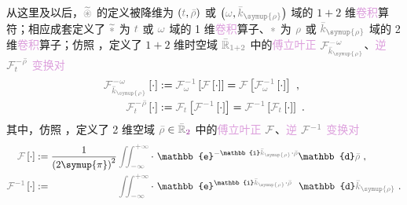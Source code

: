 从这里及以后，$\mathcolor{gray}{\widetilde \circledast}$ 的定义被降维为 $\left( \mathcolor{gray}{t}, \mathcolor{gray}{\bar{\rho}} \right)$ 或 $\left( \mathcolor{gray}{\omega}, \mathcolor{gray}{\bar{k}_{\symup{\rho}}} \right)$ 域的 $1+2$ 维\textcolor{Plum}{卷积}算符；相应成套定义了 $\mathcolor{gray}{\widetilde *}$ 为 $\mathcolor{gray}{t}$ 或 $\mathcolor{gray}{\omega}$ 域的 1 维\textcolor{Plum}{卷积}算子、$\mathcolor{gray}{*}$ 为 $\mathcolor{gray}{\rho}$ 或 $\mathcolor{gray}{\bar{k}_{\symup{\rho}}}$ 域的 2 维\textcolor{Plum}{卷积}算子；仿照 ，定义了 $1+2$ 维时空域 $\mathcolor{gray}{\bar{\mathbb{R}}_{1+2}}$ 中的\textcolor{Plum}{傅立叶正} $\mathcolor{gray}{\mathcal F_{\bar{k}_{\symup{\rho}}}^{-\omega}}$、\textcolor{Plum}{逆} $\mathcolor{gray}{\mathcal F^{-\bar{\rho}}_{t}}$ \textcolor{Plum}{变换对}
\begin{subequations} \label{eq:FT-trho_wkrho}
	\abovedisplayskip=4pt
	\belowdisplayskip=6pt
\begin{align}
	\mathcolor{gray}{\mathcal F_{\bar{k}_{\symup{\rho}}}^{-\omega}} \left[ \cdot \right] &:= \mathcolor{gray}{\mathcal F_{\omega}^{-1}} \left[ \mathcolor{gray}{\mathcal F} \left[ \cdot \right] \right] = \mathcolor{gray}{\mathcal F} \left[ \mathcolor{gray}{\mathcal F_{\omega}^{-1}} \left[ \cdot \right] \right] ~, \label{eq:FT-wkrho} \\
	\mathcolor{gray}{\mathcal F^{-\bar{\rho}}_{t}} \left[ \cdot \right] &:= \mathcolor{gray}{\mathcal F_{t}} \left[ \mathcolor{gray}{\mathcal F^{-1}} \left[ \cdot \right] \right] = \mathcolor{gray}{\mathcal F^{-1}} \left[ \mathcolor{gray}{\mathcal F_{t}} \left[ \cdot \right] \right] ~. \label{eq:IFT-trho}
\end{align}
\end{subequations}
其中，仿照 ，定义了 2 维空域 $\mathcolor{gray}{\bar{\rho}} \in \mathcolor{gray}{\bar{\mathbb{R}}_{\textcolor{Plum}{2}}}$ 中的\textcolor{Plum}{傅立叶正} $\mathcolor{gray}{\mathcal F}$、\textcolor{Plum}{逆} $\mathcolor{gray}{\mathcal F^{-1}}$ \textcolor{Plum}{变换对}
\begin{subequations} \label{eq:FT-rho_krho}
	\belowdisplayskip=8pt
\begin{align}
	\mathcolor{gray}{\mathcal F} \left[ \cdot \right] &:= \frac{ 1 }{ \left( 2\symup{\pi} \right)^2 } \mathcolor{gray}{\iint_{-\infty}^{+\infty}} \cdot~ \mathbb{e}^{-\mathbb{i}\mathcolor{gray}{\bar{k}_{\symup{\rho}}} \cdot \mathcolor{gray}{\bar{\rho}}} \mathbb{d}\mathcolor{gray}{\bar{\rho}} ~, \label{eq:FT-krho} \\
	\mathcolor{gray}{\mathcal F^{-1}} \left[ \cdot \right] &:= \hphantom{\frac{ 1 }{ \left( 2\symup{\pi} \right)^2 }} \mathcolor{gray}{\iint_{-\infty}^{+\infty}} \cdot~ \mathbb{e}^{\mathbb{i}\mathcolor{gray}{\bar{k}_{\symup{\rho}}} \cdot \mathcolor{gray}{\bar{\rho}}} \hphantom{^-} \mathbb{d}\mathcolor{gray}{\bar{k}_{\symup{\rho}}} ~. \label{eq:IFT-rho}
\end{align}
\end{subequations}


